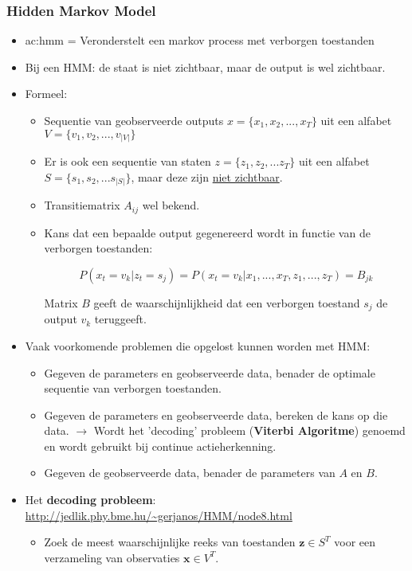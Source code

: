 \subsubsection{Hidden Markov Model}
\begin{itemize}
	\item \gls{ac:hmm} = Veronderstelt een markov process met verborgen toestanden
	\item Bij een HMM: de staat is niet zichtbaar, maar de output is wel zichtbaar.
	\item Formeel:
	\begin{itemize}
		\item Sequentie van geobserveerde outputs $x = \{x_1, x_2, ..., x_T\}$  uit een alfabet $V = \{v_1, v_2, ..., v_{|V|}\}$
		\item Er is ook een sequentie van staten $z =\{z_1, z_2, ... z_T\}$ uit een alfabet $S = \{s_1, s_2, ... s_{|S|}\}$, maar deze zijn \underline{niet zichtbaar}.
		\item Transitiematrix $A_{ij}$ wel bekend.
		\item Kans dat een bepaalde output gegenereerd wordt in functie van de verborgen toestanden:
		
		$$P(x_t = v_k|z_t = s_j) = P(x_t = v_k | x_1, ..., x_T, z_1, ..., z_T) = B_{jk}$$
		
		Matrix $B$ geeft de waarschijnlijkheid dat een verborgen toestand $s_j$ de output $v_k$ teruggeeft.
	\end{itemize}
	\item Vaak voorkomende problemen die opgelost kunnen worden met HMM:
	\begin{itemize}
		\item Gegeven de parameters en geobserveerde data, benader de optimale sequentie van verborgen toestanden.
		\item Gegeven de parameters en geobserveerde data, bereken de kans op die data. $\rightarrow$ Wordt het 'decoding' probleem (\textbf{Viterbi Algoritme}) genoemd en wordt gebruikt bij continue actieherkenning.
		\item Gegeven de geobserveerde data, benader de parameters van $A$ en $B$.
	\end{itemize}
	\item Het \textbf{decoding probleem}: \url{http://jedlik.phy.bme.hu/~gerjanos/HMM/node8.html}
	\begin{itemize}
		\item Zoek de meest waarschijnlijke reeks van toestanden $\textbf{z} \in S^T$ voor een verzameling van observaties $\textbf{x} \in V^T$.
		

\end{itemize}
\end{itemize}
